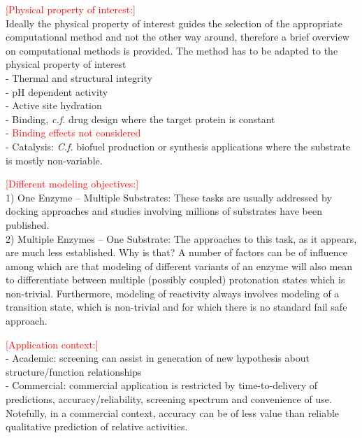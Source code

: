 \noindent\textcolor{red}{[Physical property of interest:]}\\
Ideally the physical property of interest guides the selection of the appropriate computational method and not the other way around, therefore a brief overview on computational methods is provided.
The method has to be adapted to the physical property of interest\\
- Thermal and structural integrity\\
- pH dependent activity\cite{ludwiczek2013strategies}\\
- Active site hydration\\
- Binding, \textit{c.f.} drug design where the target protein is constant\\
- \textcolor{red}{Binding effects not considered}\\
- Catalysis: \textit{C.f.} biofuel production or synthesis applications where the substrate is mostly non-variable.

\noindent\textcolor{red}{[Different modeling objectives:]}\\
1) One Enzyme -- Multiple Substrates:
These tasks are usually addressed by docking approaches and studies involving millions of substrates have been published\cite{zhou2010high}.\\
2) Multiple Enzymes -- One Substrate:
The approaches to this task, as it appears, are much less established.
Why is that?
A number of factors can be of influence among which are that modeling of different variants of an enzyme will also mean to differentiate between multiple (possibly coupled) protonation states which is non-trivial.
Furthermore, modeling of reactivity always involves modeling of a transition state, which is non-trivial and for which there is no standard fail safe approach.

\noindent\textcolor{red}{[Application context:]}\\
- Academic: screening can assist in generation of new hypothesis about structure/function relationships\\
- Commercial: commercial application is restricted by time-to-delivery of predictions, accuracy/reliability, screening spectrum and convenience of use.
Notefully, in a commercial context, accuracy can be of less value than reliable qualitative prediction of relative activities.

